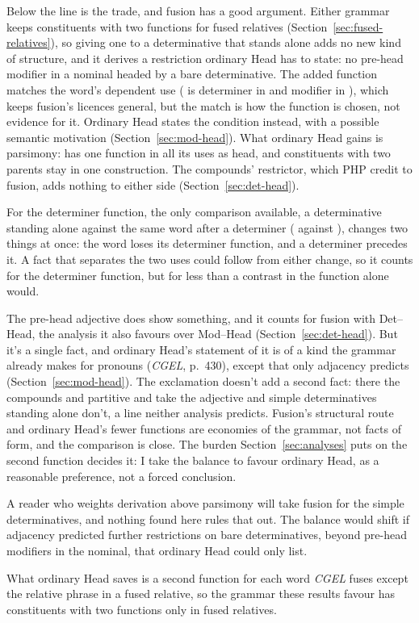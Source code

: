 Below the line is the trade, and fusion has a good argument. Either grammar keeps constituents with two functions for fused relatives (Section~\ref{sec:fused-relatives}), so giving one to a determinative that stands alone adds no new kind of structure, and it derives a restriction ordinary Head has to state: no pre-head modifier in a nominal headed by a bare determinative. The added function matches the word's dependent use ( is determiner in  and modifier in ), which keeps fusion's licences general, but the match is how the function is chosen, not evidence for it. Ordinary Head states the condition instead, with a possible semantic motivation (Section~\ref{sec:mod-head}). What ordinary Head gains is parsimony:  has one function in all its uses as head, and constituents with two parents stay in one construction. The compounds' restrictor, which PHP credit to fusion, adds nothing to either side (Section~\ref{sec:det-head}).

For the determiner function, the only comparison available, a determinative standing alone against the same word after a determiner ( against ), changes two things at once: the word loses its determiner function, and a determiner precedes it. A fact that separates the two uses could follow from either change, so it counts for the determiner function, but for less than a contrast in the function alone would.

The pre-head adjective does show something, and it counts for fusion with Det--Head, the analysis it also favours over Mod--Head (Section~\ref{sec:det-head}). But it's a single fact, and ordinary Head's statement of it is of a kind the grammar already makes for pronouns (\textit{CGEL}, p.~430), except that only adjacency predicts  (Section~\ref{sec:mod-head}). The exclamation doesn't add a second fact: there the compounds and partitive  and  take the adjective and simple determinatives standing alone don't, a line neither analysis predicts. Fusion's structural route and ordinary Head's fewer functions are economies of the grammar, not facts of form, and the comparison is close. The burden Section~\ref{sec:analyses} puts on the second function decides it: I take the balance to favour ordinary Head, as a reasonable preference, not a forced conclusion.

A reader who weights derivation above parsimony will take fusion for the simple determinatives, and nothing found here rules that out. The balance would shift if adjacency predicted further restrictions on bare determinatives, beyond pre-head modifiers in the nominal, that ordinary Head could only list.

What ordinary Head saves is a second function for each word \textit{CGEL} fuses except the relative phrase in a fused relative, so the grammar these results favour has constituents with two functions only in fused relatives.
